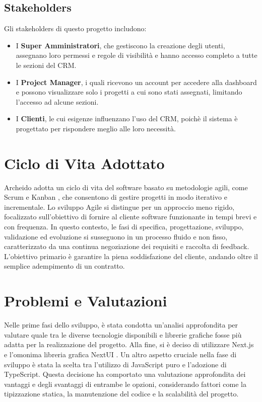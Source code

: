\documentclass[target=bach,aauheader=,style=]{thud}
\begin{document}
\subsection{Stakeholders}
Gli stakeholders di questo progetto includono:

\begin{itemize}
    \item I \textbf{Super Amministratori}, che gestiscono la creazione degli utenti, assegnano loro permessi e regole di visibilità e hanno accesso completo a tutte le sezioni del CRM. 
    \item I \textbf{Project Manager}, i quali ricevono un account per accedere alla dashboard e possono visualizzare solo i progetti a cui sono stati assegnati, limitando l'accesso ad alcune sezioni.
    \item I \textbf{Clienti}, le cui esigenze influenzano l'uso del CRM, poichè il sistema è progettato per rispondere meglio alle loro necessità.
\end{itemize}

\section{Ciclo di Vita Adottato}
Archeido adotta un ciclo di vita del software basato su metodologie agili, come Scrum \cite{scrumwiki2024} e Kanban \cite{kanbanwiki2024}, che consentono di gestire progetti in modo iterativo e incrementale. Lo sviluppo Agile si distingue per un approccio meno rigido, focalizzato sull'obiettivo di fornire al cliente software funzionante in tempi brevi e con frequenza. In questo contesto, le fasi di specifica, progettazione, sviluppo, validazione ed evoluzione si susseguono in un processo fluido e non fisso, caratterizzato da una continua negoziazione dei requisiti e raccolta di feedback. L'obiettivo primario è garantire la piena soddisfazione del cliente, andando oltre il semplice adempimento di un contratto.

\section{Problemi e Valutazioni}
Nelle prime fasi dello sviluppo, è stata condotta un'analisi approfondita per valutare quale tra le diverse tecnologie disponibili e librerie grafiche fosse più adatta per la realizzazione del progetto. Alla fine, si è deciso di utilizzare Next.js \cite{nextjs2024} e l'omonima libreria grafica NextUI \cite{nextui2024}. Un altro aspetto cruciale nella fase di sviluppo è stata la scelta tra l'utilizzo di JavaScript puro e l'adozione di TypeScript. Questa decisione ha comportato una valutazione approfondita dei vantaggi e degli svantaggi di entrambe le opzioni, considerando fattori come la tipizzazione statica, la manutenzione del codice e la scalabilità del progetto.
\end{document}
